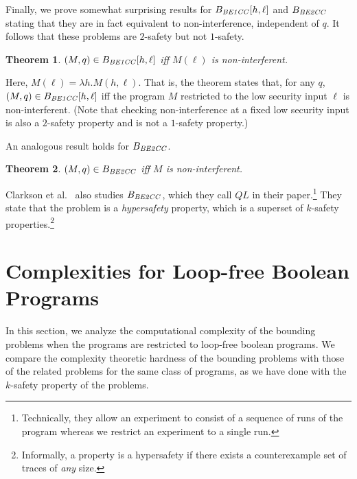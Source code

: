\documentclass{llncs}
\newtheorem{theorem}{Theorem}[section]
\begin{document}
Finally, we prove somewhat surprising results for $B_{\it
  BE1CC}[h,\ell]$ and $B_{\it BE2CC}$ stating that they are in fact
equivalent to non-interference, independent of $q$.  It follows that
these problems are $2$-safety but not $1$-safety.
\begin{theorem}
\label{thm:be3ni}
$(M,q) \in B_{\it BE1CC}[h,\ell]$ iff $M(\ell)$ is non-interferent.
\end{theorem}
Here, $M(\ell)=\lambda h. M(h,\ell)$.  That is, the theorem states
that, for any $q$, $(M, q) \in B_{\it BE1CC}[h,\ell]$ iff the
program $M$ restricted to the low security input $\ell$ is
non-interferent. (Note that checking non-interference at a fixed low
security input is also a $2$-safety property and is not a $1$-safety
property.)

An analogous result holds for $B_{\it BE2CC}$.
\begin{theorem}
\label{thm:be4ni}
$(M,q) \in B_{\it BE2CC}$ iff $M$ is non-interferent.
\end{theorem}
Clarkson et al.~\cite{DBLP:conf/csfw/ClarksonS08} also studies $B_{\it
  BE2CC}$, which they call $QL$ in their paper.\footnote{Technically,
  they allow an experiment to consist of a sequence of runs of the
  program whereas we restrict an experiment to a single run.}  They
state that the problem is a {\em hypersafety} property, which is a
superset of $k$-safety properties.\footnote{Informally, a property is
  a hypersafety if there exists a counterexample set of traces of {\em
    any} size.}



\section{Complexities for Loop-free Boolean Programs}

\label{sec:complex}

In this section, we analyze the computational complexity of the
bounding problems when the programs are restricted to loop-free
boolean programs.  We compare the complexity theoretic
hardness of the bounding problems with those of the related problems
for the same class of programs, as we have done with the $k$-safety
property of the problems.
\end{document}
